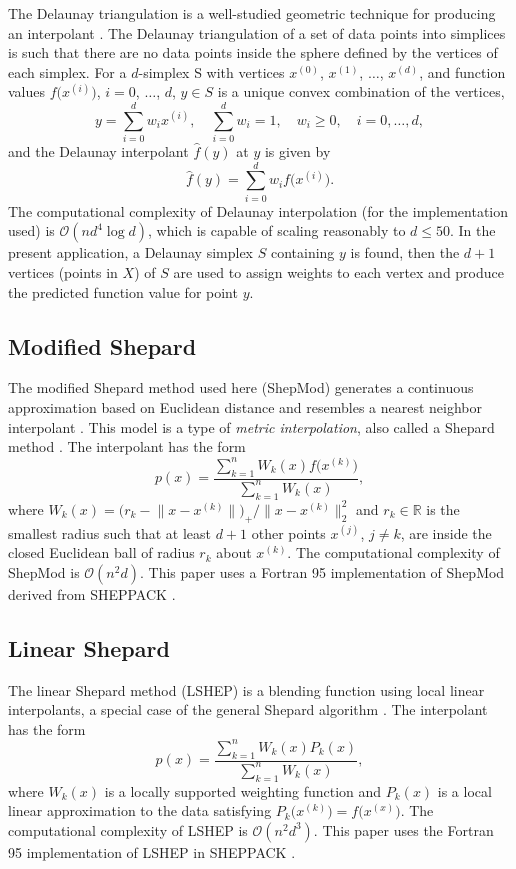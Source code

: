 \documentclass[smallextended,final]{svjour3}       %
\begin{document}
The Delaunay triangulation is a well-studied geometric technique for producing an interpolant \cite{lee1980two}. The Delaunay triangulation of a set of data points into simplices is such that there are no data points inside the sphere defined by the vertices of each simplex. For a $d$-simplex S with vertices $x^{(0)}$, $x^{(1)}$, $\ldots$, $x^{(d)}$, and function values $f\bigl(x^{(i)}\bigr)$, $i=0$, $\ldots$, $d$, $y \in S$ is a unique convex combination of the vertices,
$$ y = \sum_{i=0}^{d} w_i x^{(i)}, \quad \sum_{i=0}^{d} w_i = 1, \quad w_i \geq 0, \quad i=0,\ldots,d, $$
and the Delaunay interpolant $\hat f(y)$ at $y$ is given by
$$ \hat f(y) = \sum_{i=0}^{d} w_i f\bigl(x^{(i)}\bigr). $$
The computational complexity of Delaunay interpolation (for the implementation used) is $\mathcal{O}(n d^4 \log d)$, which is capable of scaling reasonably to $d \leq 50$. In the present application, a Delaunay simplex $S$ containing $y$ is found, then the $d+1$ vertices (points in $X$) of $S$ are used to assign weights to each vertex and produce the predicted function value for point $y$.

\newpage
\subsection{Modified Shepard}
\label{sec:modified-shepard}

The modified Shepard method used here (ShepMod) generates a continuous
approximation based on Euclidean distance and resembles a nearest neighbor
interpolant \cite{cover1967nearest}. This model is a type of \textit{metric
interpolation}, also called a Shepard method
\cite{shepard1968two,gordon1978shepard}. The interpolant has the form
 $$ p(x) = \frac{\sum\limits_{k=1}^{n}W_k(x)f\bigl(x^{(k)}\bigr)}
 {\sum\limits_{k=1}^{n}W_k(x)} ,$$
where $W_k(x) = \bigl(r_k - \bigl\|x - x^{(k)}\bigr\|\bigr)_+ \big/
\bigl\|x - x^{(k)}\bigr\|_2^2$ and $r_k \in \mathbb{R}$ is the smallest
radius such that at least $d+1$ other points $x^{(j)}$, $j \not = k$, are
inside the closed Euclidean ball of radius $r_k$ about $x^{(k)}$. The
computational complexity of ShepMod is $\mathcal{O}(n^2d)$. This paper
uses a Fortran 95 implementation of ShepMod derived from SHEPPACK
\cite{thacker2010algorithm}.

\subsection{Linear Shepard}
The linear Shepard method (LSHEP) is a blending function using local linear
interpolants, a special case of the general Shepard algorithm
\cite{thacker2010algorithm}. The interpolant has the form
 $$ p(x) = \frac{\sum\limits_{k=1}^{n}W_k(x)P_k(x)}
 {\sum\limits_{k=1}^{n}W_k(x)} ,$$
where $W_k(x)$ is a locally supported weighting function and $P_k(x)$ is
a local linear approximation to the data satisfying $P_k\bigl(x^{(k)}\bigr)
= f\bigl(x^{(x)}\bigr)$. The computational complexity of LSHEP is
$\mathcal{O}(n^2d^3)$. This paper uses the Fortran 95 implementation of
LSHEP in SHEPPACK \cite{thacker2010algorithm}.
\end{document}
